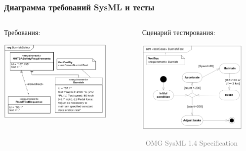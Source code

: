 \documentclass[xetex,mathserif,serif]{beamer}
\newcommand{\attribution}[1] {
    \vspace{-5mm}\begin{flushright}\begin{scriptsize}\textcolor{gray}{\textcopyright\, #1}\end{scriptsize}\end{flushright}
}
\begin{document}
    \begin{frame}
        \frametitle{Диаграмма требований SysML и тесты}
        \begin{columns}
            \begin{column}{0.5\textwidth}
                Требования:
                \begin{center}
                    \includegraphics[width=0.8\textwidth]{sysMlRequirementsTest.png}
                \end{center}
            \end{column}
            \begin{column}{0.5\textwidth}
                Сценарий тестирования:
                \begin{center}
                    \includegraphics[width=0.9\textwidth]{sysMlRequirementsTestActivity.png}
                    \attribution{OMG SysML 1.4 Specification}
                \end{center}
            \end{column}
        \end{columns}
    \end{frame}
\end{document}
